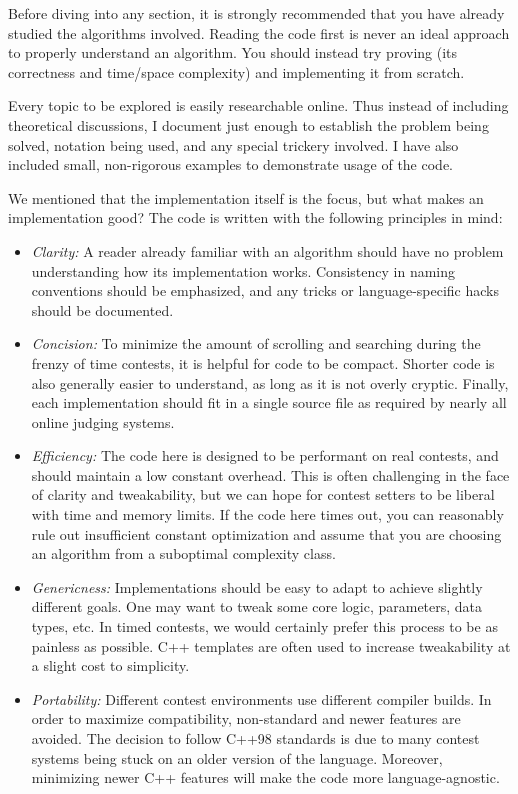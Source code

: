 \documentclass[10pt,letterpaper,twoside]{book}
\begin{document}
Before diving into any section, it is strongly recommended that you have already studied the algorithms involved. Reading the code first is never an ideal approach to properly understand an algorithm. You should instead try proving (its correctness and time/space complexity) and implementing it from scratch.

Every topic to be explored is easily researchable online. Thus instead of including theoretical discussions, I document just enough to establish the problem being solved, notation being used, and any special trickery involved. I have also included small, non-rigorous examples to demonstrate usage of the code.

We mentioned that the implementation itself is the focus, but what makes an implementation good? The code is written with the following principles in mind:
\begin{itemize}
	\item \textit{Clarity:} A reader already familiar with an algorithm should have no problem understanding how its implementation works. Consistency in naming conventions should be emphasized, and any tricks or language-specific hacks should be documented.
	\item \textit{Concision:} To minimize the amount of scrolling and searching during the frenzy of time contests, it is helpful for code to be compact. Shorter code is also generally easier to understand, as long as it is not overly cryptic. Finally, each implementation should fit in a single source file as required by nearly all online judging systems.
	\item \textit{Efficiency:} The code here is designed to be performant on real contests, and should maintain a low constant overhead. This is often challenging in the face of clarity and tweakability, but we can hope for contest setters to be liberal with time and memory limits. If the code here times out, you can reasonably rule out insufficient constant optimization and assume that you are choosing an algorithm from a suboptimal complexity class.
	\item \textit{Genericness:} Implementations should be easy to adapt to achieve slightly different goals. One may want to tweak some core logic, parameters, data types, etc. In timed contests, we would certainly prefer this process to be as painless as possible. C++ templates are often used to increase tweakability at a slight cost to simplicity.
	\item \textit{Portability:} Different contest environments use different compiler builds. In order to maximize compatibility, non-standard and newer features are avoided. The decision to follow C++98 standards is due to many contest systems being stuck on an older version of the language. Moreover, minimizing newer C++ features will make the code more language-agnostic.
\end{itemize}
\end{document}
